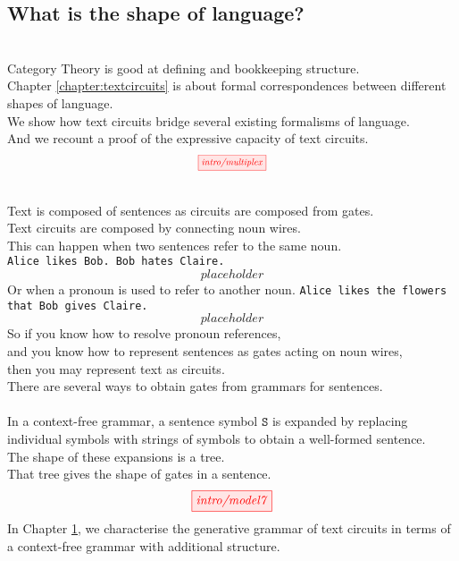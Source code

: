 \begin{fullwidth}
\begin{centering}
\section{What is the shape of language?}
\\
Category Theory is good at defining and bookkeeping structure.\\
Chapter \ref{chapter:textcircuits} is about formal correspondences between different shapes of language.\\
We show how text circuits bridge several existing formalisms of language.\\
And we recount a proof of the expressive capacity of text circuits.
\[\scalebox{0.75}{\tikzfig{intro/multiplex}}\]

\\
Text is composed of sentences as circuits are composed from gates.\\
Text circuits are composed by connecting noun wires.\\
This can happen when two sentences refer to the same noun.\\
\texttt{Alice likes Bob. Bob hates Claire.}\\
\[placeholder\]
Or when a pronoun is used to refer to another noun.
\texttt{Alice likes the flowers that Bob gives Claire.}
\[placeholder\]
So if you know how to resolve pronoun references,\\
and you know how to represent sentences as gates acting on noun wires,\\
then you may represent text as circuits.\\
There are several ways to obtain gates from grammars for sentences.\\

\\
In a context-free grammar, a sentence symbol $\texttt{S}$ is expanded by replacing individual symbols with strings of symbols to obtain a well-formed sentence.\\
The shape of these expansions is a tree.\\
That tree gives the shape of gates in a sentence.\\
\[\tikzfig{intro/model7}\]
In Chapter \ref{}, we characterise the generative grammar of text circuits in terms of a context-free grammar with additional structure.


\end{centering}
\end{fullwidth}
